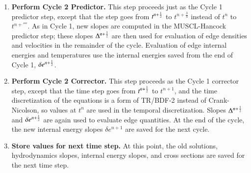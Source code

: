 \begin{enumerate}

\item \textbf{Perform Cycle 2 Predictor.} This step proceeds
just as the Cycle 1 predictor step, except that the
step goes from $t^{n+\frac{1}{2}}$ to $t^{n+\frac{3}{4}}$ instead
of $t^n$ to $t^{n+\fourth}$. As in Cycle 1, new slopes
are computed in the MUSCL-Hancock predictor step;
these slopes $\Delta^{n+\frac{1}{2}}$ are then used for
evaluation of edge densities and velocities in the remainder
of the cycle. Evaluation of edge internal energies
and temperatures use the internal energies saved
from the end of Cycle 1, $\delta e^{n+\frac{1}{2}}$.


\item \textbf{Perform Cycle 2 Corrector.} This step proceeds
as the Cycle 1 corrector step, except that the time step goes
from $t^{n+\frac{1}{2}}$ to $t^{n+1}$, and the time discretization
of the equations is a form of TR/BDF-2
instead of Crank-Nicolson, so values at $t^n$
are used in the temporal discretization. Slopes
$\Delta^{n+\frac{1}{2}}$ and $\delta e^{n+\frac{1}{2}}$ are again
used to evaluate edge quantities. At the end
of the cycle, the new internal energy slopes $\delta e^{n+1}$
are saved for the next cycle.


\item \textbf{Store values for next time step.}
At this point, the old solutions, hydrodynamics slopes,
internal energy slopes, and cross sections
are saved for the next time step.

\end{enumerate}

